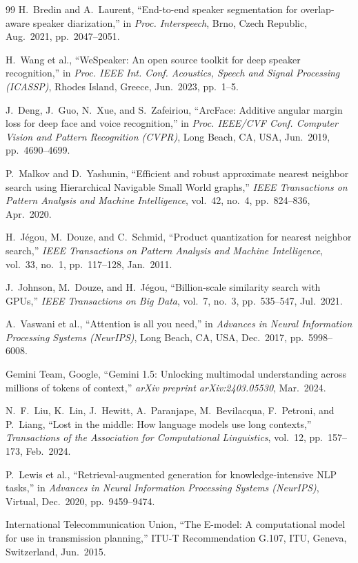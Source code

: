 \documentclass[12pt,oneside,letterpaper]{report}
\numberwithin{equation}{chapter} %
\begin{document}
\begin{singlespace}
\begin{thebibliography}{99}
H.~Bredin and A.~Laurent, ``End-to-end speaker segmentation for overlap-aware speaker diarization,'' in \emph{Proc. Interspeech}, Brno, Czech Republic, Aug.~2021, pp.~2047--2051.

H.~Wang et al., ``WeSpeaker: An open source toolkit for deep speaker recognition,'' in \emph{Proc. IEEE Int. Conf. Acoustics, Speech and Signal Processing (ICASSP)}, Rhodes Island, Greece, Jun.~2023, pp.~1--5.

J.~Deng, J.~Guo, N.~Xue, and S.~Zafeiriou, ``ArcFace: Additive angular margin loss for deep face and voice recognition,'' in \emph{Proc. IEEE/CVF Conf. Computer Vision and Pattern Recognition (CVPR)}, Long Beach, CA, USA, Jun.~2019, pp.~4690--4699.

P.~Malkov and D.~Yashunin, ``Efficient and robust approximate nearest neighbor search using Hierarchical Navigable Small World graphs,'' \emph{IEEE Transactions on Pattern Analysis and Machine Intelligence}, vol.~42, no.~4, pp.~824--836, Apr.~2020.

H.~Jégou, M.~Douze, and C.~Schmid, ``Product quantization for nearest neighbor search,'' \emph{IEEE Transactions on Pattern Analysis and Machine Intelligence}, vol.~33, no.~1, pp.~117--128, Jan.~2011.

J.~Johnson, M.~Douze, and H.~Jégou, ``Billion-scale similarity search with GPUs,'' \emph{IEEE Transactions on Big Data}, vol.~7, no.~3, pp.~535--547, Jul.~2021.

A.~Vaswani et al., ``Attention is all you need,'' in \emph{Advances in Neural Information Processing Systems (NeurIPS)}, Long Beach, CA, USA, Dec.~2017, pp.~5998--6008.

Gemini Team, Google, ``Gemini 1.5: Unlocking multimodal understanding across millions of tokens of context,'' \emph{arXiv preprint arXiv:2403.05530}, Mar.~2024.

N.~F.~Liu, K.~Lin, J.~Hewitt, A.~Paranjape, M.~Bevilacqua, F.~Petroni, and P.~Liang, ``Lost in the middle: How language models use long contexts,'' \emph{Transactions of the Association for Computational Linguistics}, vol.~12, pp.~157--173, Feb.~2024.

P.~Lewis et al., ``Retrieval-augmented generation for knowledge-intensive NLP tasks,'' in \emph{Advances in Neural Information Processing Systems (NeurIPS)}, Virtual, Dec.~2020, pp.~9459--9474.

International Telecommunication Union, ``The E-model: A computational model for use in transmission planning,'' ITU-T Recommendation G.107, ITU, Geneva, Switzerland, Jun.~2015.

\end{thebibliography}
\end{singlespace}
\end{document}
